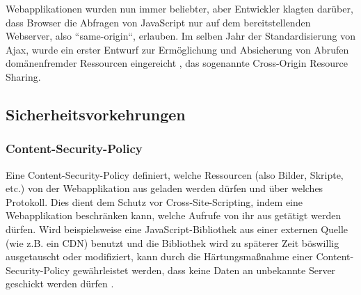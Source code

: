 Webapplikationen wurden nun immer beliebter, aber Entwickler klagten darüber, dass Browser die Abfragen von JavaScript nur auf dem bereitstellenden Webserver, also ``same-origin``, erlauben\cite{CrossSiteXHRWithCORS}. Im selben Jahr der Standardisierung von Ajax, wurde ein erster Entwurf zur Ermöglichung und Absicherung von Abrufen domänenfremder Ressourcen eingereicht \cite{AuthorizingCORS}, das sogenannte Cross-Origin Resource Sharing.

%

\subsection{Sicherheitsvorkehrungen}


\subsubsection{Content-Security-Policy}


Eine Content-Security-Policy definiert, welche Ressourcen (also Bilder, Skripte, etc.) von der Webapplikation aus geladen werden dürfen und über welches Protokoll. Dies dient dem Schutz vor Cross-Site-Scripting, indem eine Webapplikation beschränken kann, welche Aufrufe von ihr aus getätigt werden dürfen. Wird beispielsweise eine JavaScript-Bibliothek aus einer externen Quelle (wie z.B. ein CDN) benutzt und die Bibliothek wird zu späterer Zeit böswillig ausgetauscht oder modifiziert, kann durch die Härtungsmaßnahme einer Content-Security-Policy gewährleistet werden, dass keine Daten an unbekannte Server geschickt werden dürfen \cite{MDNContentSecurityPolicy}.

